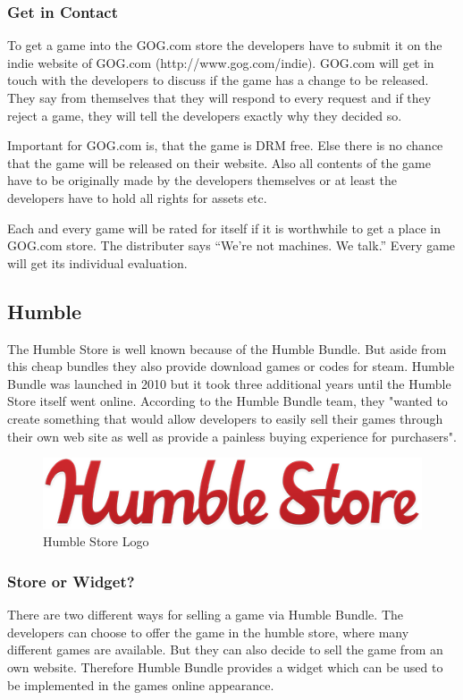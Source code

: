 \subsubsection{Get in Contact}
\label{subsec:gog_contact}
To get a game into the GOG.com store the developers have to submit it on the indie website of GOG.com (http://www.gog.com/indie). GOG.com will get in touch with the developers to discuss if the game has a change to be released. They say from themselves that they will respond to every request and if they reject a game, they will tell the developers exactly why they decided so.

Important for GOG.com is, that the game is DRM free. Else there is no chance that the game will be released on their website. Also all contents of the game have to be originally made by the developers themselves or at least the developers have to hold all rights for assets etc.

Each and every game will be rated for itself if it is worthwhile to get a place in GOG.com store. The distributer says “We're not machines. We talk.” Every game will get its individual evaluation. \citep{gog_gog.com_2016}


\subsection{Humble}
\label{subsec:humble}
The Humble Store is well known because of the Humble Bundle. But aside from this cheap bundles they also provide download games or codes for steam. Humble Bundle was launched in 2010 but it took three additional years until the Humble Store itself went online. According to the Humble Bundle team, they "wanted to create something that would allow developers to easily sell their games through their own web site as well as provide a painless buying experience for purchasers". \citep{kuchera_penny_2013}

\begin{figure}[!hbp]
\includegraphics[width=\linewidth]{img/humble.png}
\centering
\caption{ Humble Store Logo }
\label{fig:humble}
\end{figure}

\subsubsection{Store or Widget?}
\label{subsec:humble_store_or_widget}
There are two different ways for selling a game via Humble Bundle. The developers can choose to offer the game in the humble store, where many different games are available. But they can also decide to sell the game from an own website. Therefore Humble Bundle provides a widget which can be used to be implemented in the games online appearance. \citep{humble_bundle_humble_2016}

